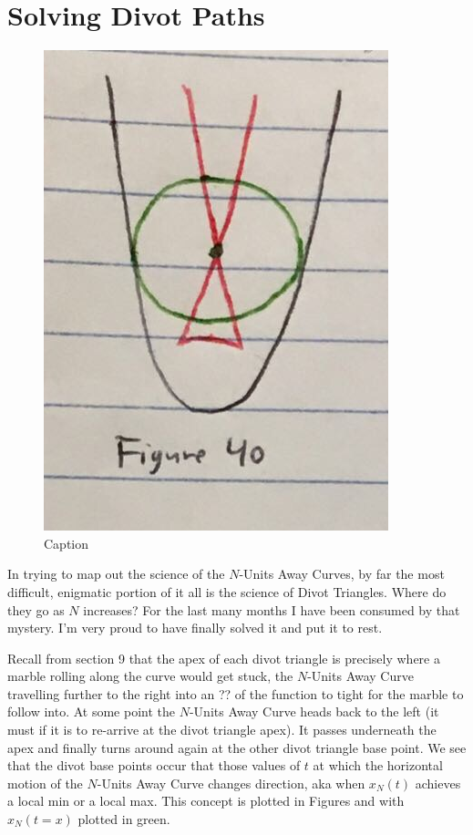 \section{Solving Divot Paths}

\renewcommand\w{0.25\textwidth}
\renewcommand\fw{0.9\linewidth}

\begin{figure}
  \label{divot:1}
  \includegraphics[width=\fw]{img/12-divot/01.png}
  \caption{Caption}
\end{figure}


In trying to map out the science of the $N$-Units Away Curves, by far the most difficult, enigmatic portion of it all is the science of Divot Triangles. Where do they go as $N$ increases? For the last many months I have been consumed by that mystery. I'm very proud to have finally solved it and put it to rest.

Recall from section 9 that the apex of each divot triangle is precisely where a marble rolling along the curve would get stuck, the $N$-Units Away Curve travelling further to the right into an ?? of the function to tight for the marble to follow into. At some point the $N$-Units Away Curve heads back to the left (it must if it is to re-arrive at the divot triangle apex). It passes underneath the apex and finally turns around again at the other divot triangle base point. We see that the divot base points occur that those values of $t$ at which the horizontal motion of the $N$-Units Away Curve changes direction, aka when $x_N(t)$ achieves a local min or a local max. This concept is plotted in Figures and with $x_N(t = x)$ plotted in green.

